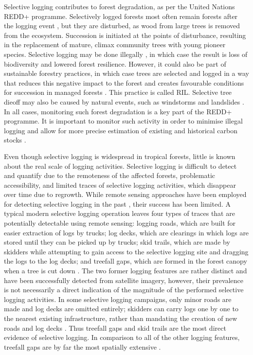 \documentclass[a4paper,12pt]{scrbook}
\begin{document}
Selective logging contributes to forest degradation, as per the United Nations \ac{REDD+} programme. Selectively logged forests most often remain forests after the logging event \citep{asner_condition_2006}, but they are disturbed, as wood from large trees is removed from the ecosystem. Succession is initiated at the points of disturbance, resulting in the replacement of mature, climax community trees with young pioneer species. Selective logging may be done illegally \citep{rutishauser_rapid_2015}, in which case the result is loss of biodiversity and lowered forest resilience. However, it could also be part of sustainable forestry practices, in which case trees are selected and logged in a way that reduces this negative impact to the forest and creates favourable conditions for succession in managed forests \citep{west_forest_2014, keller_4._2004}. This practice is called \ac{RIL}. Selective tree dieoff may also be caused by natural events, such as windstorms and landslides \citep{frolking_forest_2009}. In all cases, monitoring such forest degradation is a key part of the \ac{REDD+} programme. It is important to monitor such activity in order to minimise illegal logging and allow for more precise estimation of existing and historical carbon stocks \citep{piponiot_carbon_2016, pinard_simulated_2000}.

Even though selective logging is widespread in tropical forests, little is known about the real scale of logging activities. Selective logging is difficult to detect and quantify due to the remoteness of the affected forests, problematic accessibility, and limited traces of selective logging activities, which disappear over time due to regrowth. While remote sensing approaches have been employed for detecting selective logging in the past \citep{shimizu_using_2017, frolking_forest_2009, broadbent_recovery_2006, keller_4._2004}, their success has been limited. A typical modern selective logging operation leaves four types of traces that are potentially detectable using remote sensing: logging roads, which are built for easier extraction of logs by trucks; log decks, which are clearings in which logs are stored until they can be picked up by trucks; skid trails, which are made by skidders while attempting to gain access to the selective logging site and dragging the logs to the log decks; and treefall gaps, which are formed in the forest canopy when a tree is cut down \citep{asner_remote_2002}. The two former logging features are rather distinct and have been successfully detected from satellite imagery, however, their prevalence is not necessarily a direct indication of the magnitude of the performed selective logging activities. In some selective logging campaigns, only minor roads are made and log decks are omitted entirely; skidders can carry logs one by one to the nearest existing infrastructure, rather than mandating the creation of new roads and log decks \citep{read_spatial_2003}. Thus treefall gaps and skid trails are the most direct evidence of selective logging. In comparison to all of the other logging features, treefall gaps are by far the most spatially extensive \citep{asner_remote_2002}.
\end{document}

